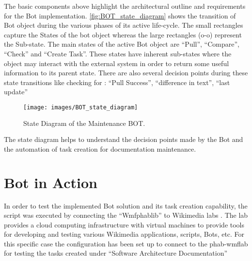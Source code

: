 The basic components above highlight the architectural outline and requirements for the Bot implementation. \autoref{fig:BOT_state_diagram} shows the transition of Bot object during the various phases of its active life-cycle. The small rectangles capture the States of the bot object whereas the large rectangles (o-o) represent the Sub-state. The main states of the active Bot object are \enquote{Pull}, \enquote{Compare}, \enquote{Check} and \enquote{Create Task}. These states have inherent sub-states where the object may interact with the external system in order to return some useful information to its parent state. There are also several decision points during these state transitions like checking for : \enquote{Pull Success}, \enquote{difference in text}, \enquote{last update}
\begin{figure}
  \centering
  \texttt{[image: images/BOT\_state\_diagram]}
  \caption[State Diagram of the Maintenance BOT]{State Diagram of the Maintenance BOT.}\label{fig:BOT_state_diagram}
\end{figure}
The state diagram helps to understand the decision points made by the Bot and the automation of task creation for documentation maintenance. 


\section{Bot in Action}
In order to test the implemented Bot solution and its task creation capability, the script was executed by connecting the \enquote{Wmfphablib} to Wikimedia labs \cite{Wm_labs}. The lab provides a cloud computing infrastructure with virtual machines to provide tools for developing and testing various Wikimedia applications, scripts, Bots, etc. For this specific case the configuration has been set up to connect to the phab-wmflab \cite{phab_labs} for testing the tasks created under \enquote{Software Architecture Documentation}
